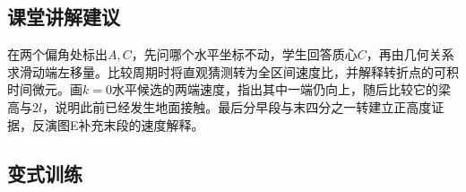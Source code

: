 \documentclass[UTF8,fontset=fandol,a4paper,11pt]{ctexart}
\begin{document}


\subsection*{课堂讲解建议}

在两个偏角处标出$A,C$，先问哪个水平坐标不动，学生回答质心$C$，再由几何关系求滑动端左移量。比较周期时将直观猜测转为全区间速度比，并解释转折点的可积时间微元。画$k=0$水平候选的两端速度，指出其中一端仍向上，随后比较它的梁高与$2l$，说明此前已经发生地面接触。最后分早段与末四分之一转建立正高度证据，反演图E补充末段的速度解释。



\subsection*{变式训练}
\end{document}

